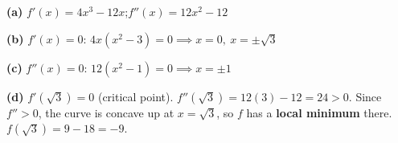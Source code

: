 \documentclass[addpoints]{exam}
\begin{document}
\begin{questions}
\begin{solution}[8cm]
\textbf{(a)} $f'(x) = 4x^3 - 12x$;\quad $f''(x) = 12x^2 - 12$

\textbf{(b)} $f'(x) = 0$: $4x(x^2 - 3) = 0 \implies x = 0,\ x = \pm\sqrt{3}$

\textbf{(c)} $f''(x) = 0$: $12(x^2 - 1) = 0 \implies x = \pm 1$

\textbf{(d)} $f'(\sqrt{3}) = 0$ (critical point). $f''(\sqrt{3}) = 12(3) - 12 = 24 > 0$.
Since $f'' > 0$, the curve is concave up at $x = \sqrt{3}$, so $f$ has a \textbf{local minimum}
there. $f(\sqrt{3}) = 9 - 18 = -9$.
\end{solution}

\end{questions}
\end{document}
